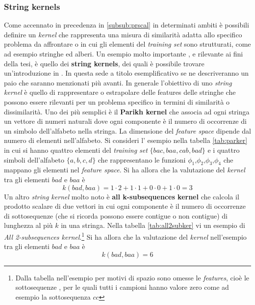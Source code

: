 \subsubsection{String kernels}
Come accennato in precedenza in \ref{subsub:prscal} in determinati ambiti è possibili definire un \textit{kernel} che rappresenta una misura di similarità adatta allo specifico problema da affrontare o in cui gli elementi del \textit{training set} sono strutturati, come ad esempio stringhe ed alberi. Un esempio molto importante , e rilevante ai fini della tesi, è quello dei \textbf{string kernels}, dei quali  è possibile trovare un'introduzione in \cite[p. 60]{DeLaHiguera10}. In questa sede a titolo esemplificativo se ne descriveranno un paio che saranno menzionati più avanti. In generale l'obiettivo di uno \textit{string kernel} è quello di rappresentare o estrapolare delle features delle stringhe che possono essere rilevanti per un problema specifico in termini di similarità o dissimilarità. Uno dei più semplici è il \textbf{Parikh kernel} che associa ad ogni stringa un vettore di numeri naturali dove ogni componente è il numero di occorrenze di un simbolo dell'alfabeto nella stringa. La dimensione del \textit{feature space} dipende dal numero di elementi nell'alfabeto. Si consideri l' esempio nella tabella \ref{tab:parker} in cui si hanno quattro elementi del \textit{training set} $\{bac , baa , cab , bad\}$ e i quattro simboli dell'alfabeto $\{a,b,c,d\}$ che rappresentano le funzioni $\phi_{1}\text{,}\phi_{2}\text{,}\phi_{3}\text{,}\phi_{4}$ che mappano gli elementi nel \textit{feature space}. Si ha allora che la valutazione del \textit{kernel} tra gli elementi $bad \text{ e } baa$ è
\begin{equation*}
k(bad , baa) = 1\cdot2 + 1\cdot1 + 0\cdot0+1\cdot0 = 3
\end{equation*}
Un altro \textit{string kernel} molto noto è \textbf{all k-subsequences kernel} che calcola il prodotto scalare di due vettori in cui ogni componente è il numero di occorrenze di sottosequenze (che si ricorda possono essere contigue o non contigue) di lunghezza al più $k$ in una stringa. Nella tabella \ref{tab:all2subker} vi un esempio di \textit{All 2-subsequences kernel}.\footnote{Dalla tabella nell'esempio per motivi di spazio sono omesse le \textit{features}, cioè le sottosequenze , per le quali tutti i campioni hanno valore zero come ad esempio la sottosequenza $cc$} Si ha allora che la valutazione del \textit{kernel} nell'esempio tra gli elementi $bad \text{ e } baa$ è
\begin{equation*}
k(bad , baa) =  6
\end{equation*} 
